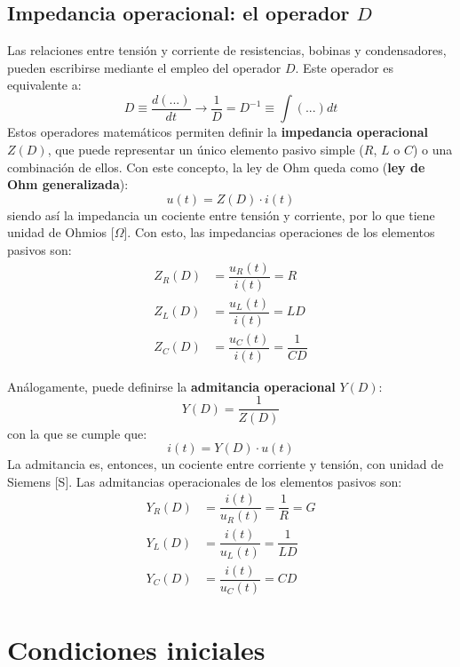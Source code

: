 \subsection{Impedancia operacional: el operador $D$
}\label{sec:operador_D}
Las relaciones entre tensión y corriente de resistencias, bobinas y
condensadores, pueden escribirse mediante el empleo del operador
$D$. Este operador es equivalente a:
\begin{equation*}
  D\equiv \dfrac{d(...)}{dt} \rightarrow \dfrac{1}{D}=D^{-1}\equiv \int (...) dt
\end{equation*}
Estos operadores matemáticos permiten definir la \textbf{impedancia
  operacional} $Z(D)$, que puede representar un único elemento pasivo
simple ($R$, $L$ o $C$) o una combinación de ellos. Con este concepto,
la ley de Ohm queda como (\textbf{ley de Ohm generalizada}):
\begin{equation*}
  u(t)=Z(D)\cdot i(t)
\end{equation*}
siendo así la impedancia un cociente entre tensión y corriente, por lo
que tiene unidad de Ohmios [$\Omega$].  Con esto, las impedancias
operaciones de los elementos pasivos son:
\begin{align*}
  Z_R(D)&=\dfrac{u_R(t)}{i(t)}=R\\
  Z_L(D)&=\dfrac{u_L(t)}{i(t)}=LD\\
  Z_C(D)&=\dfrac{u_C(t)}{i(t)}=\dfrac{1}{CD}
\end{align*}
	
Análogamente, puede definirse la \textbf{admitancia operacional}
$Y(D)$:
\begin{equation*}
  Y(D)=\dfrac{1}{Z(D)}
\end{equation*}
con la que se cumple que:
\begin{equation*}
  i(t)=Y(D)\cdot u(t)
\end{equation*}
La admitancia es, entonces, un cociente entre corriente y tensión, con
unidad de Siemens [S]. Las admitancias operacionales de los elementos
pasivos son:
\begin{align*}
  Y_R(D)&=\dfrac{i(t)}{u_R(t)}=\dfrac{1}{R}=G\\
  Y_L(D)&=\dfrac{i(t)}{u_L(t)}=\dfrac{1}{LD}\\
  Y_C(D)&=\dfrac{i(t)}{u_C(t)}=CD
\end{align*} 

\section{Condiciones iniciales}\label{sec:condiciones_iniciales}
	
